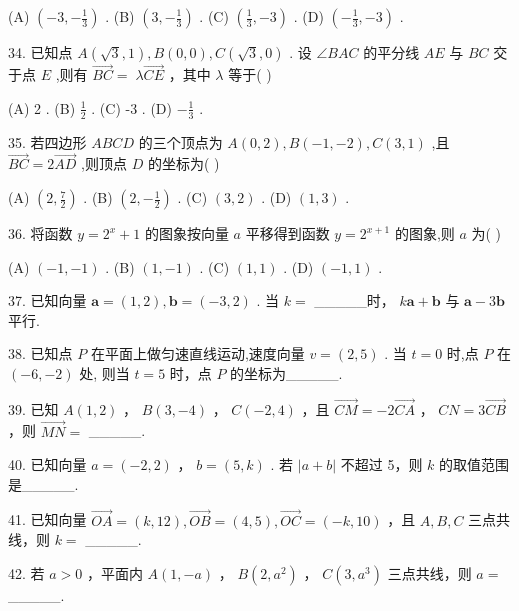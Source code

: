 \documentclass[10pt]{article}
\begin{document}
(A) \(\left( {-3, - \frac{1}{3}}\right)\) . (B) \(\left( {3, - \frac{1}{3}}\right)\) . (C) \(\left( {\frac{1}{3}, - 3}\right)\) . (D) \(\left( {-\frac{1}{3}, - 3}\right)\) .

34. 已知点 \(A\left( {\sqrt{3},1}\right) ,B\left( {0,0}\right) ,C\left( {\sqrt{3},0}\right)\) . 设 \(\angle {BAC}\) 的平分线 \({AE}\) 与 \({BC}\) 交于点 \(E\) ,则有 \(\overrightarrow{BC} = \; \lambda \overrightarrow{CE}\) ，其中 \(\lambda\) 等于( )

(A) 2 . (B) \(\frac{1}{2}\) . (C) -3 . (D) \(- \frac{1}{3}\) .

35. 若四边形 \({ABCD}\) 的三个顶点为 \(A\left( {0,2}\right) ,B\left( {-1, - 2}\right) ,C\left( {3,1}\right)\) ,且 \(\overrightarrow{BC} = 2\overrightarrow{AD}\) ,则顶点 \(D\) 的坐标为( )

(A) \(\left( {2,\frac{7}{2}}\right)\) . (B) \(\left( {2, - \frac{1}{2}}\right)\) . (C) \(\left( {3,2}\right)\) . (D) \(\left( {1,3}\right)\) .

36. 将函数 \(y = {2}^{x} + 1\) 的图象按向量 \(a\) 平移得到函数 \(y = {2}^{x + 1}\) 的图象,则 \(a\) 为( )

(A) \(\left( {-1, - 1}\right)\) . (B) \(\left( {1, - 1}\right)\) . (C) \(\left( {1,1}\right)\) . (D) \(\left( {-1,1}\right)\) .

37. 已知向量 \(\mathbf{a} = \left( {1,2}\right) ,\mathbf{b} = \left( {-3,2}\right)\) . 当 \(k =\) \_\_\_\_\_时， \(k\mathbf{a} + \mathbf{b}\) 与 \(\mathbf{a} - 3\mathbf{b}\) 平行.

38. 已知点 \(P\) 在平面上做匀速直线运动,速度向量 \(v = \left( {2,5}\right)\) . 当 \(t = 0\) 时,点 \(P\) 在 \(\left( {-6, - 2}\right)\) 处, 则当 \(t = 5\) 时，点 \(P\) 的坐标为\_\_\_\_\_.

39. 已知 \(A\left( {1,2}\right)\) ， \(B\left( {3, - 4}\right)\) ， \(C\left( {-2,4}\right)\) ，且 \(\overrightarrow{CM} =  - 2\overrightarrow{CA}\) ， \({CN} = 3\overrightarrow{CB}\) ，则 \(\overrightarrow{MN} =\) \_\_\_\_\_.

40. 已知向量 \(a = \left( {-2,2}\right)\) ， \(b = \left( {5,k}\right)\) . 若 \(\left| {a + b}\right|\) 不超过 5，则 \(k\) 的取值范围是\_\_\_\_\_.

41. 已知向量 \(\overrightarrow{OA} = \left( {k,{12}}\right) ,\overrightarrow{OB} = \left( {4,5}\right) ,\overrightarrow{OC} = \left( {-k,{10}}\right)\) ，且 \(A,B,C\) 三点共线，则 \(k =\) \_\_\_\_\_.

42. 若 \(a > 0\) ，平面内 \(A\left( {1, - a}\right)\) ， \(B\left( {2,{a}^{2}}\right)\) ， \(C\left( {3,{a}^{3}}\right)\) 三点共线，则 \(a =\) \_\_\_\_\_.
\end{document}
